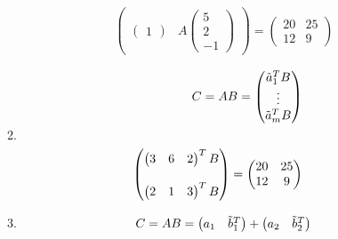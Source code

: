 \documentclass[12pt]{article}
\begin{document}
\begin{enumerate}
\begin{enumerate}
\begin{align*}
\begin{pmatrix}
\begin{pmatrix}
                    1
                \end{pmatrix}
                & A
                \begin{pmatrix}
                    5 \\
                    2 \\
                    -1
                \end{pmatrix}
            \end{pmatrix}
            = \begin{pmatrix}
                20 & 25 \\
                12 & 9
            \end{pmatrix}
        \end{align*}
        \item 
        \begin{align*}
            C = AB = \begin{pmatrix}
                \Tilde{a}_1^T B \\
                \vdots \\
                \Tilde{a}_m^T B
            \end{pmatrix} && \\ && \\
            \begin{pmatrix}
                \begin{pmatrix}
                    3 & 6 & 2
                \end{pmatrix}^T
                B \\ \\
                \begin{pmatrix}
                    2 & 1 & 3
                \end{pmatrix}^T
                B
            \end{pmatrix}
            = \begin{pmatrix}
                20 & 25 \\
                12 & 9 
            \end{pmatrix}
        \end{align*}
        \item 
        \begin{align*}
            C = AB = \begin{pmatrix}
                a_1 & \Tilde{b}_1^T 
            \end{pmatrix}
            + \begin{pmatrix}
                a_2 & \Tilde{b}_2^T
            \end{pmatrix}

\end{align*}
\end{enumerate}
\end{enumerate}
\end{document}
